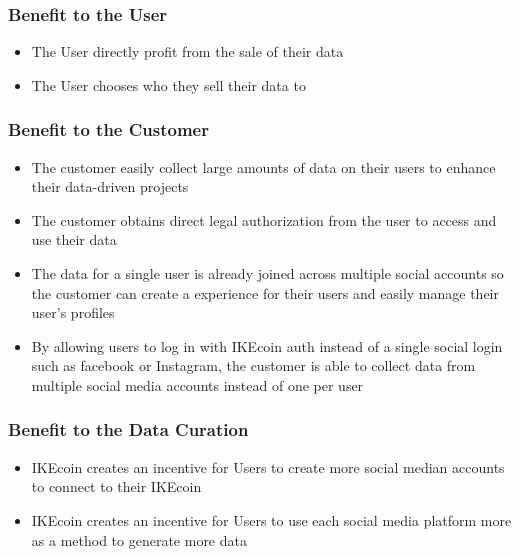 \documentclass[12pt, letterpaper, twoside]{article}
\begin{document}
\subsubsection*{Benefit to the User}
\begin{itemize}
  \setlength{\itemsep}{1pt}
  \setlength{\parskip}{0pt}
  \setlength{\parsep}{0pt}
  \item The User directly profit from the sale of their data
  \item The User chooses who they sell their data to
\end{itemize}

\subsubsection*{Benefit to the Customer}
\begin{itemize}
  \setlength{\itemsep}{1pt}
  \setlength{\parskip}{0pt}
  \setlength{\parsep}{0pt}
  \item The customer easily collect large amounts of data on their users to enhance their data-driven projects
  \item The customer obtains direct legal authorization from the user to access and use their data
  \item The data for a single user is already joined across multiple social accounts so the customer can create a experience for their users and easily manage their user's profiles
  \item By allowing users to log in with IKEcoin auth instead of a single social login such as facebook or Instagram, the customer is able to collect data from multiple social media accounts instead of one per user
\end{itemize}

\subsubsection*{Benefit to the Data Curation}
\begin{itemize}
  \setlength{\itemsep}{1pt}
  \setlength{\parskip}{0pt}
  \setlength{\parsep}{0pt}
  \item IKEcoin creates an incentive for Users to create more social median accounts to connect to their IKEcoin
  \item IKEcoin creates an incentive for Users to use each social media platform more as a method to generate more data
\end{itemize}
\end{document}

